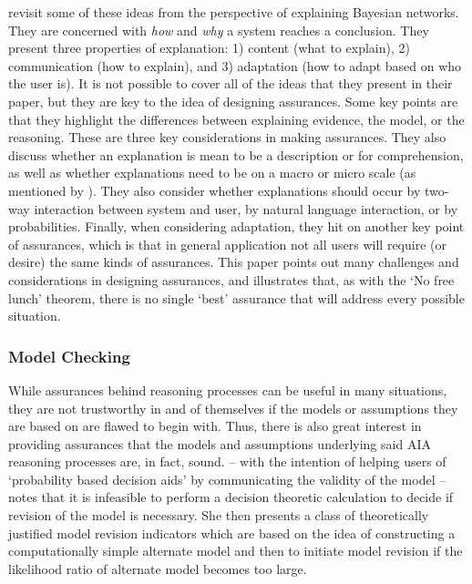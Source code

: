     \citet{Lacave2002-cu} revisit some of these ideas from the perspective of explaining Bayesian networks. They are concerned with \emph{how} and \emph{why} a system reaches a conclusion. They present three properties of explanation: 1) content (what to explain), 2) communication (how to explain), and 3) adaptation (how to adapt based on who the user is). It is not possible to cover all of the ideas that they present in their paper, but they are key to the idea of designing assurances. Some key points are that they highlight the differences between explaining evidence, the model, or the reasoning. These are three key considerations in making assurances. They also discuss whether an explanation is mean to be a description or for comprehension, as well as whether explanations need to be on a macro or micro scale (as mentioned by \citeauthor{Ruping2006-xj}). They also consider whether explanations should occur by two-way interaction between system and user, by natural language interaction, or by probabilities. Finally, when considering adaptation, they hit on another key point of assurances, which is that in general application not all users will require (or desire) the same kinds of assurances. This paper points out many challenges and considerations in designing assurances, and illustrates that, as with the `No free lunch' theorem, there is no single `best' assurance that will address every possible situation.


\subsubsection{Model Checking} \label{sec:model_checking}
    While assurances behind reasoning processes can be useful in many situations, they are not trustworthy in and of themselves if the models or assumptions they are based on are flawed to begin with. Thus, there is also great interest in providing assurances that the models and assumptions underlying said AIA reasoning processes are, in fact, sound. \citet{Laskey1991-mf} -- with the intention of helping users of `probability based decision aids' by communicating the validity of the model -- notes that it is infeasible to perform a decision theoretic calculation to decide if revision of the model is necessary. She then presents a class of theoretically justified model revision indicators which are based on the idea of constructing a computationally simple alternate model and then to initiate model revision if the likelihood ratio of alternate model becomes too large. 

